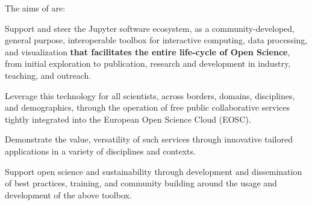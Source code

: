 
\noindent The aims of \TheProject are:

\begin{compactenum}
\item Support and steer the Jupyter software ecosystem, as a
  community-developed, general purpose, interoperable toolbox for
  interactive computing, data processing, and visualization
  \textbf{that facilitates the entire life-cycle of Open Science},
  from initial exploration to publication, research and development in
  industry, teaching, and outreach.

\item Leverage this technology for all scientists, across borders,
  domains, disciplines, and demographics, through the operation of
  free public collaborative services tightly integrated into the
  European Open Science Cloud (EOSC).

\item Demonstrate the value, versatility of such services through
  innovative tailored applications in a variety of disciplines and
  contexts.

\item Support open science and sustainability through development and
  dissemination of best practices, training, and community building
  around the usage and development of the above toolbox.
\end{compactenum}

  


